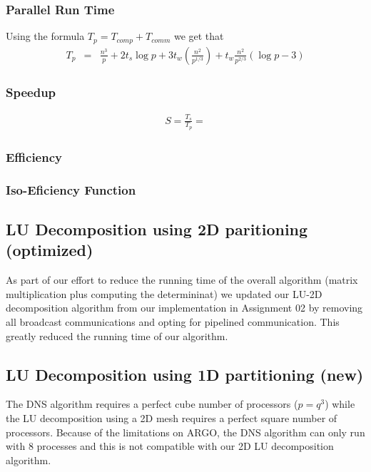 \documentclass{article}
\begin{document}
\subsubsection{Parallel Run Time}

Using the formula $T_p = T_{{comp}} + T_{{comm}}$ we get that 
\begin{eqnarray*}
T_p &=& \frac{n^3}{p} + 2 t_s \log{p} + 3 t_w \left( \frac{n^2}{{p}^{1/3}} \right) + t_w \frac{n^2}{p^{2/3}} (\log{p} - 3)
\end{eqnarray*}

\subsubsection{Speedup}

\begin{eqnarray*}
S = \frac{T_s}{T_p} = 
\end{eqnarray*}

\subsubsection{Efficiency}

\subsubsection{Iso-Eficiency Function}

\subsection{LU Decomposition using 2D paritioning (optimized)}

As part of our effort to reduce the running time of the overall algorithm
(matrix multiplication plus computing the determininat) we updated our LU-2D
decomposition algorithm from our implementation in Assignment 02 by removing all
broadcast communications and opting for pipelined communication.  This greatly
reduced the running time of our algorithm.

\subsection{LU Decomposition using 1D partitioning (new)}


The DNS algorithm requires a perfect cube number of processors ($p = q^3$) while
the LU decomposition using a 2D mesh requires a perfect square number of
processors.  Because of the limitations on ARGO, the DNS algorithm can only run
with 8 processes and this is not compatible with our 2D LU decomposition
algorithm.
\end{document}
